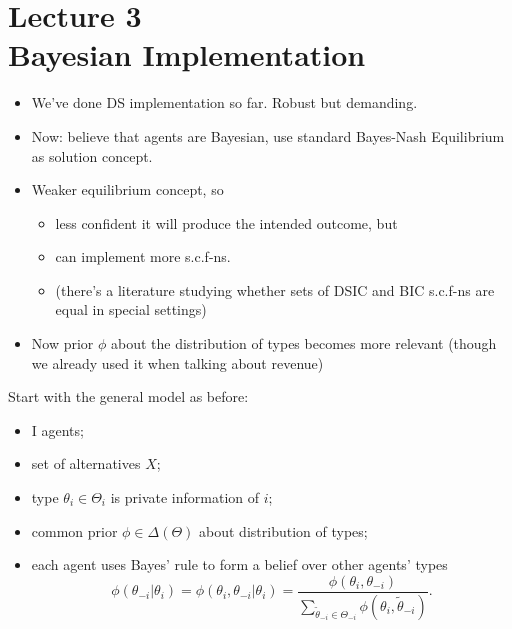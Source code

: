 \documentclass[english,handout]{beamer}		%
\def\lyxframeend{} %
\begin{document}
\section{Lecture 3 \\ Bayesian Implementation}

\begin{itemize}
	\item We've done DS implementation so far. Robust but demanding.
	\item Now: believe that agents are Bayesian, use standard Bayes-Nash Equilibrium as solution concept.
	\pause
	\item Weaker equilibrium concept, so
	\begin{itemize}
		\item less confident it will produce the intended outcome, but
		\item can implement more s.c.f-ns. 
		\item (there's a literature studying whether sets of DSIC and BIC s.c.f-ns are equal in special settings)
	\end{itemize}
	\item Now prior $\phi$ about the distribution of types becomes more relevant (though we already used it when talking about revenue)
\end{itemize}
\lyxframeend


Start with the general model as before:
\begin{itemize}
	\item I agents;
	\item set of alternatives $X$;
	\item type $\theta_{i}\in\Theta_{i}$ is private information of $i$;
	\item common prior $\phi \in \varDelta(\Theta)$ about distribution of types;
	\item each agent uses Bayes' rule to form a belief over other agents' types\\
	$$\phi(\theta_{-i}|\theta_{i}) = \phi(\theta_{i},\theta_{-i}|\theta_{i}) = \frac{\phi(\theta_{i}, \theta_{-i}) }{\sum_{\tilde\theta_{-i}\in\Theta_{-i}} \phi(\theta_{i},\tilde\theta_{-i})}.$$
\end{itemize}
\lyxframeend
\end{document}
